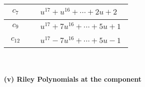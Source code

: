 \documentclass[1p]{elsarticle_modified}
\theoremstyle{definition}
\begin{document}
\begin{tabular}{m{50pt}|m{274pt}}
\hline $$\begin{aligned}c_{7}\end{aligned}$$&$\begin{aligned}
&u^{17}+u^{16}+\cdots+2 u+2
\end{aligned}$\\
\hline $$\begin{aligned}c_{9}\end{aligned}$$&$\begin{aligned}
&u^{17}+7 u^{16}+\cdots+5 u+1
\end{aligned}$\\
\hline $$\begin{aligned}c_{12}\end{aligned}$$&$\begin{aligned}
&u^{17}-7 u^{16}+\cdots+5 u-1
\end{aligned}$\\
\hline
\end{tabular}\\~\\
\newpage\renewcommand{\arraystretch}{1}
\flushleft \textbf{(v) Riley Polynomials at the component}\newline \\
\end{document}
